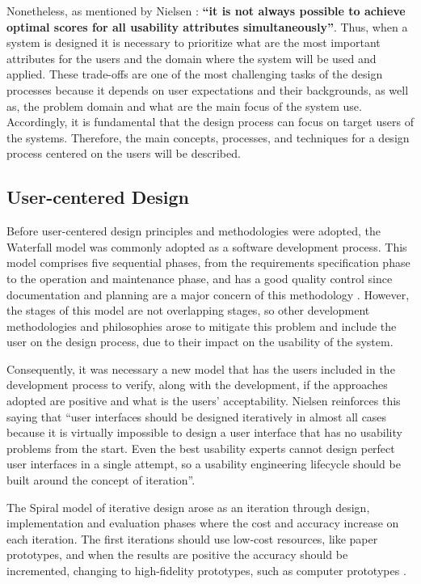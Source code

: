 Nonetheless, as mentioned by Nielsen \cite{usabilityEngineering}: \textbf{“it is not always possible to achieve optimal scores for all usability attributes simultaneously”}. Thus, when a system is designed it is necessary to prioritize what are the most important attributes for the users and the domain where the system will be used and applied. These trade-offs are one of the most challenging tasks of the design processes because it depends on user expectations and their backgrounds, as well as, the problem domain and what are the main focus of the system use. Accordingly, it is fundamental that the design process can focus on target users of the systems. Therefore, the main concepts, processes, and techniques for a design process centered on the users will be described.


\subsection{User-centered Design}
\label{subsec:user_centered_design}
Before user-centered design principles and methodologies were adopted, the Waterfall model was commonly adopted as a software development process. This model comprises five sequential phases, from the requirements specification phase to the operation and maintenance phase, and has a good quality control since documentation and planning are a major concern of this methodology \cite{aComparisonBetweenThreeSDLCModelsWatterfallSpiralIncrementalIterative}. However, the stages of this model are not overlapping stages, so other development methodologies and philosophies arose to mitigate this problem and include the user on the design process, due to their impact on the usability of the system.

Consequently, it was necessary a new model that has the users included in the development process to verify, along with the development, if the approaches adopted are positive and what is the users' acceptability. Nielsen \cite{iterativeUserInterfaceDesign} reinforces this saying that “user interfaces should be designed iteratively in almost all cases because it is virtually impossible to design a user interface that has no usability problems from the start. Even the best usability experts cannot design perfect user interfaces in a single attempt, so a usability engineering lifecycle should be built around the concept of iteration”.

The Spiral model of iterative design arose as an iteration through design, implementation and evaluation phases where the cost and accuracy increase on each iteration. The first iterations should use low-cost resources, like paper prototypes, and when the results are positive the accuracy should be incremented, changing to high-fidelity prototypes, such as computer prototypes \cite{interactionDesign_beyondHumanComputerInteraction}. %

